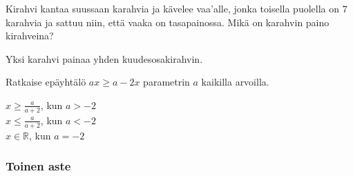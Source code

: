 \begin{multicols}{2}
\begin{tehtava}
Kirahvi kantaa suussaan karahvia ja kävelee vaa'alle, jonka toisella puolella on $7$ karahvia ja sattuu niin, että vaaka on tasapainossa. Mikä on karahvin paino kirahveina?
	\begin{vastaus}
			Yksi karahvi painaa yhden kuudesosakirahvin.
	\end{vastaus}
\end{tehtava}
	
\begin{tehtava} 
Ratkaise epäyhtälö $ax \geq a-2x$ parametrin $a$ kaikilla arvoilla.
    \begin{vastaus}
        $x \geq \frac{a}{a+2}$, kun $a > -2$ \\
        $x \leq \frac{a}{a+2}$, kun $a < -2$ \\
    $x \in \mathbb{R}$, kun $a = -2$ \\
	\end{vastaus}
\end{tehtava}

\end{multicols}

\subsubsection*{Toinen aste}

